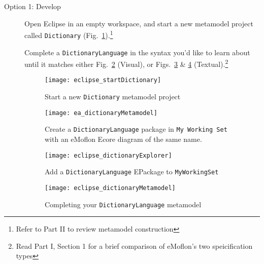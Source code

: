\begin{description}

\item[Option 1: Develop] Open Eclipse in an empty workspace, and start a new metamodel project called \texttt{Dict\-ion\-ary}
(Fig.~\ref{eclipse:startMetamodel}).\footnote{Refer to Part II to review metamodel construction} 

Complete a \texttt{DictionaryLanguage} in the syntax you'd like to learn about until it matches either Fig.~\ref{ea:dictLang} (Visual), or
Figs.~\ref{eclipse:dictLang} \& \ref{eclipse:dictLangMetamodel} (Textual).\footnote{Read Part I, Section 1 for a brief comparison of eMoflon's two
speicification types}

\begin{figure}[htbp]
\begin{center}
  \texttt{[image: eclipse\_startDictionary]}
  \caption{Start a new \texttt{Dictionary} metamodel project}
  \label{eclipse:startMetamodel}
\end{center}
\end{figure}

\begin{figure}[htbp]
  \hspace{-1cm}
  \texttt{[image: ea\_dictionaryMetamodel]}
  \caption{Create a \texttt{DictionaryLanguage} package in \texttt{My Working Set} with an eMoflon Ecore diagram of the same name.}
  \label{ea:dictLang}
\end{figure}

\newpage

\begin{figure}[htbp]
\begin{center}
  \texttt{[image: eclipse\_dictionaryExplorer]}
  \caption{Add a \texttt{DictionaryLanguage} EPackage to \texttt{MyWorkingSet}}
  \label{eclipse:dictLang}
\end{center}
\end{figure}

\vspace{0.5cm}

\begin{figure}[h!]
  \hspace{-1cm}
  \texttt{[image: eclipse\_dictionaryMetamodel]}
  \caption{Completing your \texttt{DictionaryLanguage} metamodel}
  \label{eclipse:dictLangMetamodel}
\end{figure}

\newpage %


\end{description}
